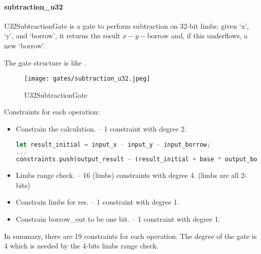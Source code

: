 \paragraph{subtraction\_u32}

U32SubtractionGate is a gate to perform subtraction on 32-bit limbs: given `x', `y', and `borrow', it returns 
the result $x - y - \text{borrow}$ and, if this underflows, a new `borrow'.

The gate structure is like .

\begin{figure}[!ht]
    \centering
    \texttt{[image: gates/subtraction\_u32.jpeg]}
    \caption{U32SubtractionGate}
    \label{fig:subtraction-u32}
\end{figure}

Constraints for each operation:
\begin{itemize}
    \item Constrain the calculation. -- 1 constraint with degree 2.
    \begin{lstlisting}[language=rust]
let result_initial = input_x - input_y - input_borrow;
...
constraints.push(output_result - (result_initial + base * output_borrow));
    \end{lstlisting}
    \item Limbs range check. -- 16 (limbs) constraints with degree 4. (limbs are all 2-bits)
    \item Constrain limbs for res. -- 1 constraint with degree 1.
    \item Constrain borrow\_out to be one bit. -- 1 constraint with degree 1.
\end{itemize}

In summary, there are 19 constraints for each operation. The degree of the gate is 4 which is needed by the 4-bits limbs range check.

